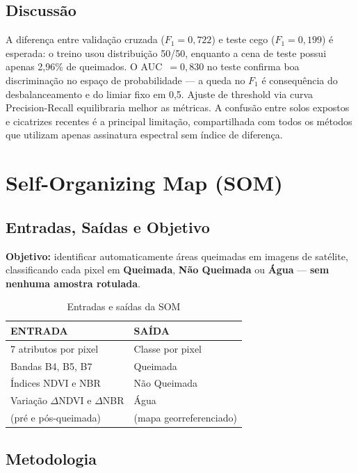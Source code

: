 \documentclass[conference]{IEEEtran}
\begin{document}
\subsection{Discussão}

A diferença entre validação cruzada ($F_1 = 0{,}722$) e teste cego
($F_1 = 0{,}199$) é esperada: o treino usou distribuição 50/50, enquanto a
cena de teste possui apenas 2,96\% de queimados. O AUC~$= 0{,}830$ no
teste confirma boa discriminação no espaço de probabilidade — a queda no
$F_1$ é consequência do desbalanceamento e do limiar fixo em 0,5.
Ajuste de threshold via curva Precision-Recall equilibraria melhor as
métricas. A confusão entre solos expostos e cicatrizes recentes é a
principal limitação, compartilhada com todos os métodos que utilizam
apenas assinatura espectral sem índice de diferença.

\section{Self-Organizing Map (SOM)}

\subsection{Entradas, Saídas e Objetivo}

\textbf{Objetivo:} identificar automaticamente áreas queimadas em imagens
de satélite, classificando cada pixel em \textbf{Queimada},
\textbf{Não Queimada} ou \textbf{Água} — \textbf{sem nenhuma amostra
rotulada}.

\begin{table}[!t]
  \caption{Entradas e saídas da SOM}
  \label{tab:som_io}
  \centering
  \begin{tabular}{ll}
    \toprule
    \textbf{ENTRADA} & \textbf{SAÍDA} \\
    \midrule
    7 atributos por pixel     & Classe por pixel \\
    Bandas B4, B5, B7         & Queimada \\
    Índices NDVI e NBR        & Não Queimada \\
    Variação $\Delta$NDVI e $\Delta$NBR & Água \\
    (pré e pós-queimada)      & (mapa georreferenciado) \\
    \bottomrule
  \end{tabular}
\end{table}

\subsection{Metodologia}
\end{document}
